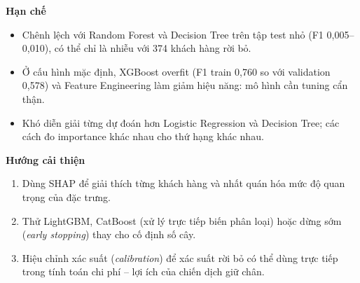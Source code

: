 \textbf{Hạn chế}
\begin{itemize}
    \item Chênh lệch với Random Forest và Decision Tree trên tập test nhỏ (F1 0,005--0,010), có thể chỉ là nhiễu với 374 khách hàng rời bỏ.
    \item Ở cấu hình mặc định, XGBoost overfit (F1 train 0,760 so với validation 0,578) và Feature Engineering làm giảm hiệu năng: mô hình cần tuning cẩn thận.
    \item Khó diễn giải từng dự đoán hơn Logistic Regression và Decision Tree; các cách đo importance khác nhau cho thứ hạng khác nhau.
\end{itemize}

\textbf{Hướng cải thiện}
\begin{enumerate}
    \item Dùng SHAP \cite{lundberg2017} để giải thích từng khách hàng và nhất quán hóa mức độ quan trọng của đặc trưng.
    \item Thử LightGBM, CatBoost (xử lý trực tiếp biến phân loại) hoặc dừng sớm (\textit{early stopping}) thay cho cố định số cây.
    \item Hiệu chỉnh xác suất (\textit{calibration}) để xác suất rời bỏ có thể dùng trực tiếp trong tính toán chi phí -- lợi ích của chiến dịch giữ chân.
\end{enumerate}

